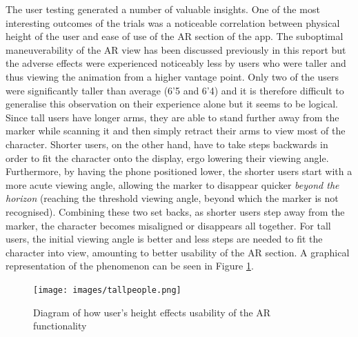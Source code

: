 \documentclass{l4proj}
\begin{document}
The user testing generated a number of valuable insights. One of the most interesting outcomes of the trials was a noticeable correlation between physical height of the user and ease of use of the AR section of the app. The suboptimal maneuverability of the AR view has been discussed previously in this report but the adverse effects were experienced noticeably less by users who were taller and thus viewing the animation from a higher vantage point. Only two of the users were significantly taller than average (6'5 and 6'4) and it is therefore difficult to generalise this observation on their experience alone but it seems to be logical. Since tall users have longer arms, they are able to stand further away from the marker while scanning it and then simply retract their arms to view most of the character. Shorter users, on the other hand, have to take steps backwards in order to fit the character onto the display, ergo lowering their viewing angle. Furthermore, by having the phone positioned lower, the shorter users start with a more acute viewing angle, allowing the marker to disappear quicker \textit{beyond the horizon} (reaching the threshold viewing angle, beyond which the marker is not recognised). Combining these two set backs, as shorter users step away from the marker, the character becomes misaligned or disappears all together. For tall users, the initial viewing angle is better and less steps are needed to fit the character into view, amounting to better usability of the AR section. A graphical representation of the phenomenon can be seen in Figure \ref{fig:heightAR}. 

\begin{figure}
\centering
\texttt{[image: images/tallpeople.png]}
\caption{Diagram of how user's height effects usability of the AR functionality} 
\label{fig:heightAR}
\end{figure}
\end{document}
